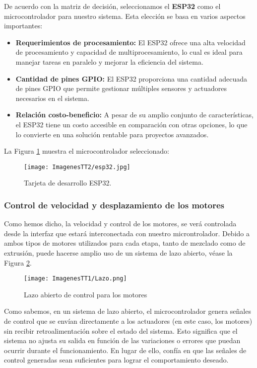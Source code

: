 \documentclass[14pt,oneside]{extarticle} %
\begin{document}
De acuerdo con la matriz de decisión, seleccionamos el \textbf{ESP32} como el microcontrolador para nuestro sistema. Esta elección se basa en varios aspectos importantes:

\begin{itemize}
    \item \textbf{Requerimientos de procesamiento:} El ESP32 ofrece una alta velocidad de procesamiento y capacidad de multiprocesamiento, lo cual es ideal para manejar tareas en paralelo y mejorar la eficiencia del sistema.
    \item \textbf{Cantidad de pines GPIO:} El ESP32 proporciona una cantidad adecuada de pines GPIO que permite gestionar múltiples sensores y actuadores necesarios en el sistema.
    \item \textbf{Relación costo-beneficio:} A pesar de su amplio conjunto de características, el ESP32 tiene un costo accesible en comparación con otras opciones, lo que lo convierte en una solución rentable para proyectos avanzados.
\end{itemize}

La Figura \ref{fig:esp32} muestra el microcontrolador seleccionado:

\begin{figure}[H]
\centering
\texttt{[image: ImagenesTT2/esp32.jpg]}
\caption{Tarjeta de desarrollo ESP32.}
\label{fig:esp32}
\end{figure}

\subsubsection{Control de velocidad y desplazamiento de los motores}

Como hemos dicho, la velocidad y control de los motores, se verá controlada desde la interfaz que estará interconectada con nuestro microntrolador. Debido a ambos tipos de motores utilizados para cada etapa, tanto de mezclado como de extrusión, puede hacerse amplio uso de un sistema de lazo abierto, véase la Figura \ref{fig:LazoAbierto}.

\begin{figure}[H]
    \centering
    \texttt{[image: ImagenesTT1/Lazo.png]}
    \caption{Lazo abierto de control para los motores}
    \label{fig:LazoAbierto}
\end{figure}

Como sabemos, en un sistema de lazo abierto, el microcontrolador genera señales de control que se envían directamente a los actuadores (en este caso, los motores) sin recibir retroalimentación sobre el estado del sistema. Esto significa que el sistema no ajusta su salida en función de las variaciones o errores que puedan ocurrir durante el funcionamiento. En lugar de ello, confía en que las señales de control generadas sean suficientes para lograr el comportamiento deseado.
\end{document}
